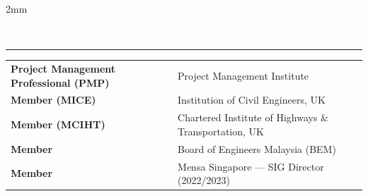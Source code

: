 \begin{addmargin}[2mm]{2mm}
\hfill
{}
\hfill
{}
\end{addmargin}

\medskip
{}\\[2pt]
{\color{Primary2}\hrule}

\begin{tabular}{m{} m{}}
{\small\textcolor{Primary1}{\textbf{Project Management Professional (PMP)}}} & \small{Project Management Institute}\\
{\small\textcolor{Primary1}{\textbf{Member (MICE)}}} & \small{Institution of Civil Engineers, UK}\\
{\small\textcolor{Primary1}{\textbf{Member (MCIHT)}}} & \small{Chartered Institute of Highways \& Transportation, UK}\\
{\small\textcolor{Primary1}{\textbf{Member}}} & \small{Board of Engineers Malaysia (BEM)}\\
{\small\textcolor{Primary1}{\textbf{Member}}} & \small{Mensa Singapore — SIG Director (2022/2023)}\\
\end{tabular}

\vspace{3mm}